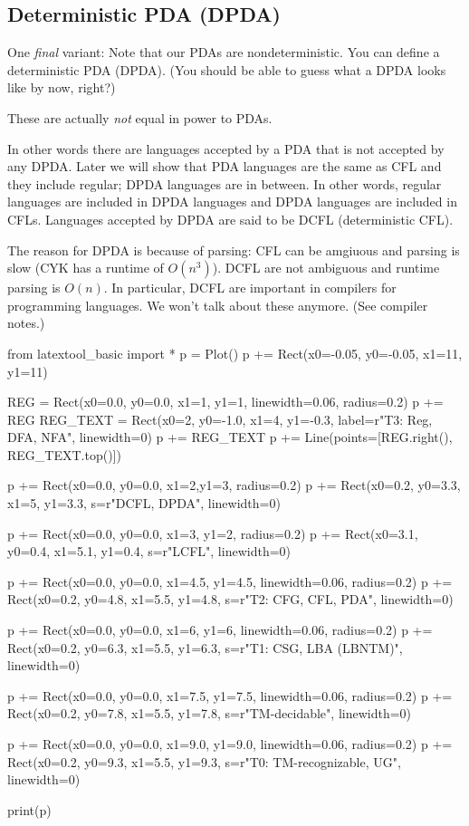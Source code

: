 \newpage
\subsection{Deterministic PDA (DPDA)}

One \textit{ final} variant:
Note that our PDAs are nondeterministic.
You can define a deterministic PDA (DPDA).
(You should be able to guess what a DPDA looks like by now, right?)

These are actually \textit{ not} equal in power to PDAs.

In other words there are languages accepted by a PDA that is not accepted
by any DPDA.
Later we will show that PDA languages are the same as CFL and they include
regular; DPDA languages are in between.
In other words, regular languages are included in DPDA languages and DPDA
languages are included in CFLs.
Languages accepted by DPDA are said to be DCFL (deterministic CFL).

The reason for DPDA is because of parsing:
CFL can be amgiuous and parsing is slow (CYK has a runtime of $O(n^3)$).
DCFL are not ambiguous and runtime parsing is $O(n)$.
In particular, DCFL are important in compilers for programming languages.
We won't talk about these anymore.
(See compiler notes.)

\begin{python}
from latextool_basic import *
p = Plot()
p += Rect(x0=-0.05, y0=-0.05, x1=11, y1=11)

REG = Rect(x0=0.0, y0=0.0, x1=1, y1=1, linewidth=0.06, radius=0.2)
p += REG
REG_TEXT = Rect(x0=2, y0=-1.0, x1=4, y1=-0.3, label=r"{\footnotesize T3: Reg, DFA, NFA}", linewidth=0)
p += REG_TEXT
p += Line(points=[REG.right(), REG_TEXT.top()])

p += Rect(x0=0.0, y0=0.0, x1=2,y1=3, radius=0.2)
p += Rect(x0=0.2, y0=3.3, x1=5, y1=3.3, s=r"{\footnotesize DCFL, DPDA}", linewidth=0)

p += Rect(x0=0.0, y0=0.0, x1=3, y1=2, radius=0.2)
p += Rect(x0=3.1, y0=0.4, x1=5.1, y1=0.4, s=r"{\footnotesize LCFL}", linewidth=0)

p += Rect(x0=0.0, y0=0.0, x1=4.5, y1=4.5, linewidth=0.06, radius=0.2)
p += Rect(x0=0.2, y0=4.8, x1=5.5, y1=4.8, s=r"{\footnotesize T2: CFG, CFL, PDA}", linewidth=0)

p += Rect(x0=0.0, y0=0.0, x1=6, y1=6, linewidth=0.06, radius=0.2)
p += Rect(x0=0.2, y0=6.3, x1=5.5, y1=6.3, s=r"{\footnotesize T1: CSG, LBA (LBNTM)}", linewidth=0)

p += Rect(x0=0.0, y0=0.0, x1=7.5, y1=7.5, linewidth=0.06, radius=0.2)
p += Rect(x0=0.2, y0=7.8, x1=5.5, y1=7.8, s=r"{\footnotesize TM-decidable}", linewidth=0)

p += Rect(x0=0.0, y0=0.0, x1=9.0, y1=9.0, linewidth=0.06, radius=0.2)
p += Rect(x0=0.2, y0=9.3, x1=5.5, y1=9.3, s=r"{\footnotesize T0: TM-recognizable, UG}", linewidth=0)


print(p)
\end{python}

